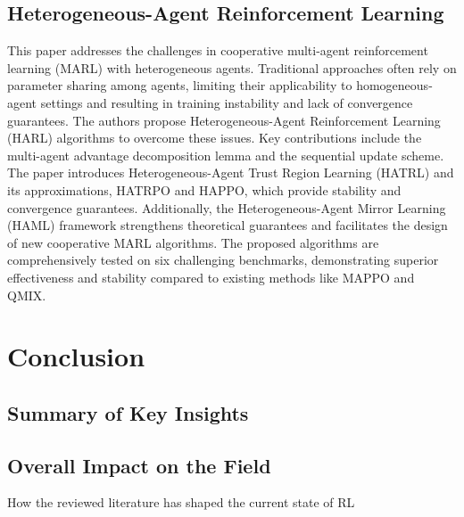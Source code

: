 \documentclass[journal]{IEEEtran}
\begin{document}
\subsection{Heterogeneous-Agent Reinforcement Learning}
This paper addresses the challenges in cooperative multi-agent reinforcement learning (MARL) with heterogeneous agents. Traditional approaches often rely on parameter sharing among agents, limiting their applicability to homogeneous-agent settings and resulting in training instability and lack of convergence guarantees. The authors propose Heterogeneous-Agent Reinforcement Learning (HARL) algorithms to overcome these issues. Key contributions include the multi-agent advantage decomposition lemma and the sequential update scheme. The paper introduces Heterogeneous-Agent Trust Region Learning (HATRL) and its approximations, HATRPO and HAPPO, which provide stability and convergence guarantees. Additionally, the Heterogeneous-Agent Mirror Learning (HAML) framework strengthens theoretical guarantees and facilitates the design of new cooperative MARL algorithms. The proposed algorithms are comprehensively tested on six challenging benchmarks, demonstrating superior effectiveness and stability compared to existing methods like MAPPO and QMIX.
\cite{zhong2024}



\section{Conclusion}
\label{sec:conclusion}

\subsection{Summary of Key Insights}


\subsection{Overall Impact on the Field}
How the reviewed literature has shaped the current state of RL


\label{sec:references}
\printbibliography

\end{document}
